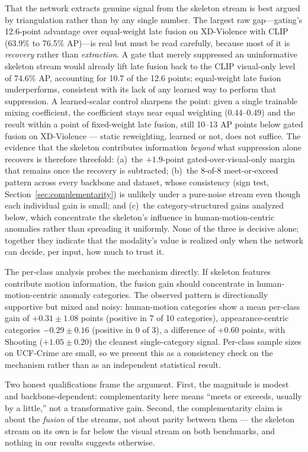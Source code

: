 That the network extracts genuine signal from the skeleton stream is best
argued by triangulation rather than by any single number. The largest raw
gap---gating's 12.6-point advantage over equal-weight late fusion on
XD-Violence with CLIP (63.9\% to 76.5\% AP)---is real but must be read
carefully, because most of it is \emph{recovery} rather than \emph{extraction}.
A gate that merely suppressed an uninformative skeleton stream would already
lift late fusion back to the CLIP visual-only level of 74.6\% AP, accounting
for 10.7 of the 12.6 points; equal-weight late fusion underperforms,
consistent with its lack of any learned way to perform that suppression. A learned-scalar control sharpens the point:
given a single trainable mixing coefficient, the coefficient stays near
equal weighting (0.44--0.49) and the result within a point of fixed-weight
late fusion, still 10--13 AP points below gated fusion on XD-Violence ---
static reweighting, learned or not, does not suffice. The evidence that the
skeleton contributes information
\emph{beyond} what suppression alone recovers is therefore threefold:
(a)~the $+1.9$-point gated-over-visual-only margin that remains once the
recovery is subtracted; (b)~the 8-of-8 meet-or-exceed pattern across every
backbone and dataset, whose consistency (sign test,
Section~\ref{sec:complementarity}) is unlikely under a pure-noise stream even
though each individual gain is small; and (c)~the category-structured gains
analyzed below, which concentrate the skeleton's influence in
human-motion-centric anomalies rather than spreading it uniformly. None of the
three is decisive alone; together they indicate that the modality's value is
realized only when the network can decide, per input, how much to trust it.

The per-class analysis probes the mechanism directly.
If skeleton features contribute motion information, the fusion gain should
concentrate in human-motion-centric anomaly categories. The observed pattern
is directionally supportive but mixed and noisy: human-motion categories show
a mean per-class gain of $+0.31 \pm 1.08$ points (positive in 7 of 10
categories), appearance-centric categories $-0.29 \pm 0.16$ (positive in 0 of
3), a difference of $+0.60$ points, with Shooting ($+1.05 \pm 0.20$) the
cleanest single-category signal. Per-class sample sizes on UCF-Crime are
small, so we present this as a consistency check on the mechanism rather than
as an independent statistical result.

Two honest qualifications frame the argument. First, the magnitude is modest
and backbone-dependent: complementarity here means ``meets or exceeds, usually
by a little,'' not a transformative gain. Second, the complementarity claim is
about the \emph{fusion} of the streams, not about parity between them --- the
skeleton stream on its own is far below the visual stream on both benchmarks,
and nothing in our results suggests otherwise.

